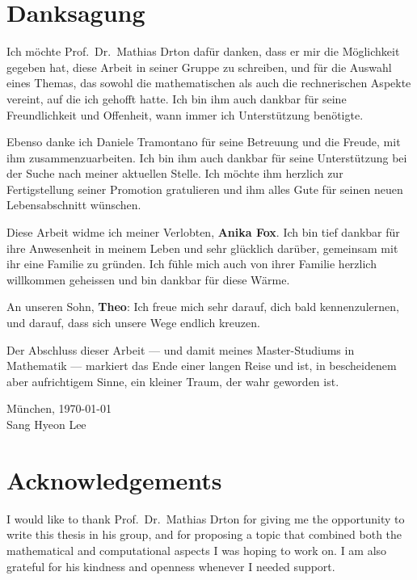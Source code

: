 \section*{Danksagung}

Ich m\"ochte Prof.\ Dr.\ Mathias Drton daf\"ur danken, dass er mir die M\"oglichkeit gegeben hat, diese Arbeit in seiner Gruppe zu schreiben, und f\"ur die Auswahl eines Themas, das sowohl die mathematischen als auch die rechnerischen Aspekte vereint, auf die ich gehofft hatte. Ich bin ihm auch dankbar f\"ur seine Freundlichkeit und Offenheit, wann immer ich Unterst\"utzung ben\"otigte.

Ebenso danke ich Daniele Tramontano f\"ur seine Betreuung und die Freude, mit ihm zusammenzuarbeiten. Ich bin ihm auch dankbar f\"ur seine Unterst\"utzung bei der Suche nach meiner aktuellen Stelle. Ich m\"ochte ihm herzlich zur Fertigstellung seiner Promotion gratulieren und ihm alles Gute f\"ur seinen neuen Lebensabschnitt w\"unschen.

\medskip

Diese Arbeit widme ich meiner Verlobten, \textbf{Anika Fox}. Ich bin tief dankbar f\"ur ihre Anwesenheit in meinem Leben und sehr gl\"ucklich dar\"uber, gemeinsam mit ihr eine Familie zu gr\"unden. Ich f\"uhle mich auch von ihrer Familie herzlich willkommen geheissen und bin dankbar f\"ur diese W\"arme.

An unseren Sohn, \textbf{Theo}: Ich freue mich sehr darauf, dich bald kennenzulernen, und darauf, dass sich unsere Wege endlich kreuzen.

\medskip

Der Abschluss dieser Arbeit — und damit meines Master-Studiums in Mathematik — markiert das Ende einer langen Reise und ist, in bescheidenem aber aufrichtigem Sinne, ein kleiner Traum, der wahr geworden ist.

\medskip

\begin{flushright}
M\"unchen, \today \\
Sang Hyeon Lee
\end{flushright}

\newpage

\section*{Acknowledgements}

I would like to thank Prof.\ Dr.\ Mathias Drton for giving me the opportunity to write this thesis in his group, and for proposing a topic that combined both the mathematical and computational aspects I was hoping to work on. I am also grateful for his kindness and openness whenever I needed support.

